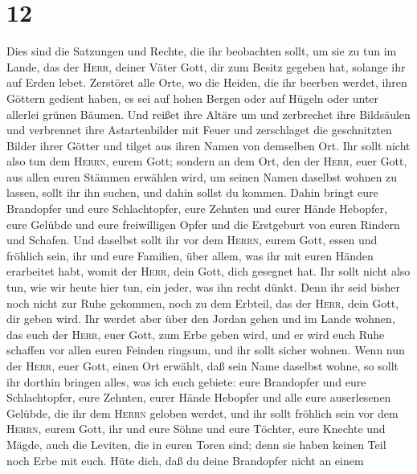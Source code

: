 \hypertarget{section-11}{%
\section{12}\label{section-11}}

 Dies sind die Satzungen und Rechte, die ihr beobachten
sollt, um sie zu tun im Lande, das der \textsc{Herr}, deiner Väter Gott,
dir zum Besitz gegeben hat, solange ihr auf Erden lebet. 
Zerstöret alle Orte, wo die Heiden, die ihr beerben werdet, ihren
Göttern gedient haben, es sei auf hohen Bergen oder auf Hügeln oder
unter allerlei grünen Bäumen.  Und reißet ihre Altäre um
und zerbrechet ihre Bildsäulen und verbrennet ihre Astartenbilder mit
Feuer und zerschlaget die geschnitzten Bilder ihrer Götter und tilget
aus ihren Namen von demselben Ort.  Ihr sollt nicht also
tun dem \textsc{Herrn}, eurem Gott;  sondern an dem Ort,
den der \textsc{Herr}, euer Gott, aus allen euren Stämmen erwählen wird,
um seinen Namen daselbst wohnen zu lassen, sollt ihr ihn suchen, und
dahin sollst du kommen.  Dahin bringt eure Brandopfer und
eure Schlachtopfer, eure Zehnten und eurer Hände Hebopfer, eure Gelübde
und eure freiwilligen Opfer und die Erstgeburt von euren Rindern und
Schafen.  Und daselbst sollt ihr vor dem \textsc{Herrn},
eurem Gott, essen und fröhlich sein, ihr und eure Familien, über allem,
was ihr mit euren Händen erarbeitet habt, womit der \textsc{Herr}, dein
Gott, dich gesegnet hat.  Ihr sollt nicht also tun, wie
wir heute hier tun, ein jeder, was ihn recht dünkt.  Denn
ihr seid bisher noch nicht zur Ruhe gekommen, noch zu dem Erbteil, das
der \textsc{Herr}, dein Gott, dir geben wird.  Ihr werdet
aber über den Jordan gehen und im Lande wohnen, das euch der
\textsc{Herr}, euer Gott, zum Erbe geben wird, und er wird euch Ruhe
schaffen vor allen euren Feinden ringsum, und ihr sollt sicher wohnen.
 Wenn nun der \textsc{Herr}, euer Gott, einen Ort
erwählt, daß sein Name daselbst wohne, so sollt ihr dorthin bringen
alles, was ich euch gebiete: eure Brandopfer und eure Schlachtopfer,
eure Zehnten, eurer Hände Hebopfer und alle eure auserlesenen Gelübde,
die ihr dem \textsc{Herrn} geloben werdet,  und ihr sollt
fröhlich sein vor dem \textsc{Herrn}, eurem Gott, ihr und eure Söhne und
eure Töchter, eure Knechte und Mägde, auch die Leviten, die in euren
Toren sind; denn sie haben keinen Teil noch Erbe mit euch.
 Hüte dich, daß du deine Brandopfer nicht an einem
